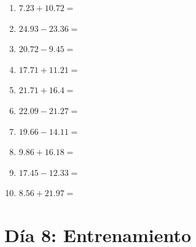 \documentclass[12pt]{article}
\begin{document}
\begin{enumerate}
\newpage
\item \large $ 7.23 + 10.72 = $ \vspace{1.5cm}
\item \large $ 24.93 - 23.36 = $ \vspace{1.5cm}
\item \large $ 20.72 - 9.45 = $ \vspace{1.5cm}
\item \large $ 17.71 + 11.21 = $ \vspace{1.5cm}
\item \large $ 21.71 + 16.4 = $ \vspace{1.5cm}
\item \large $ 22.09 - 21.27 = $ \vspace{1.5cm}
\item \large $ 19.66 - 14.11 = $ \vspace{1.5cm}
\item \large $ 9.86 + 16.18 = $ \vspace{1.5cm}
\item \large $ 17.45 - 12.33 = $ \vspace{1.5cm}
\item \large $ 8.56 + 21.97 = $ \vspace{1.5cm}
\end{enumerate}\newpage
\section*{Día 8: Entrenamiento}
\end{document}
